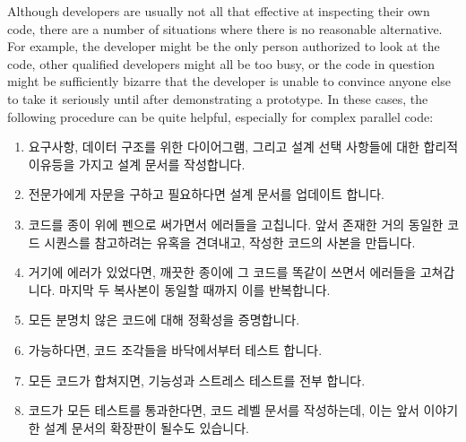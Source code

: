 Although developers are usually not all that effective at inspecting
their own code, there are a number of situations where there is no
reasonable alternative.
For example, the developer might be the only person authorized to look
at the code, other qualified developers might all be too busy, or
the code in question might be sufficiently bizarre that the developer
is unable to convince anyone else to take it seriously until after
demonstrating a prototype.
In these cases, the following procedure can be quite helpful,
especially for complex parallel code:
\fi

\begin{enumerate}
\item	요구사항, 데이터 구조를 위한 다이어그램, 그리고 설계 선택 사항들에 대한
	합리적 이유등을 가지고 설계 문서를 작성합니다.
\item	전문가에게 자문을 구하고 필요하다면 설계 문서를 업데이트 합니다.
\item	코드를 종이 위에 펜으로 써가면서 에러들을 고칩니다.
	앞서 존재한 거의 동일한 코드 시퀀스를 참고하려는 유혹을 견뎌내고,
	작성한 코드의 사본을 만듭니다.
\item	거기에 에러가 있었다면, 깨끗한 종이에 그 코드를 똑같이 쓰면서 에러들을
	고쳐갑니다.
	마지막 두 복사본이 동일할 때까지 이를 반복합니다.
\item	모든 분명치 않은 코드에 대해 정확성을 증명합니다.
\item	가능하다면, 코드 조각들을 바닥에서부터 테스트 합니다.
\item	모든 코드가 합쳐지면, 기능성과 스트레스 테스트를 전부 합니다.
\item	코드가 모든 테스트를 통과한다면, 코드 레벨 문서를 작성하는데, 이는 앞서
	이야기한 설계 문서의 확장판이 될수도 있습니다.

\end{enumerate}

